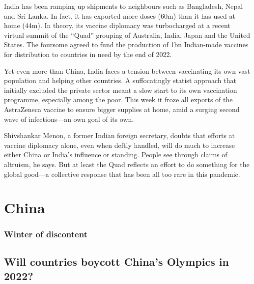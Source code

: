 \documentclass{article}
\begin{document}
India has been ramping up shipments to neighbours such as Bangladesh, Nepal and Sri Lanka. In fact, it has exported more doses (60m) than it has used at home (44m). In theory, its vaccine diplomacy was turbocharged at a recent virtual summit of the ``Quad'' grouping of Australia, India, Japan and the United States. The foursome agreed to fund the production of 1bn Indian-made vaccines for distribution to countries in need by the end of 2022. 

Yet even more than China, India faces a tension between vaccinating its own vast population and helping other countries. A suffocatingly statist approach that initially excluded the private sector meant a slow start to its own vaccination programme, especially among the poor. This week it froze all exports of the AstraZeneca vaccine to ensure bigger supplies at home, amid a surging second wave of infections---an own goal of its own. 

Shivshankar Menon, a former Indian foreign secretary, doubts that efforts at vaccine diplomacy alone, even when deftly handled, will do much to increase either China or India's influence or standing. People see through claims of altruism, he says. But at least the Quad reflects an effort to do something for the global good---a collective response that has been all too rare in this pandemic. 
\clearpage
\section{China }
\subsubsection{Winter of discontent }
\subsection{Will countries boycott China's Olympics in 2022? }
\end{document}
